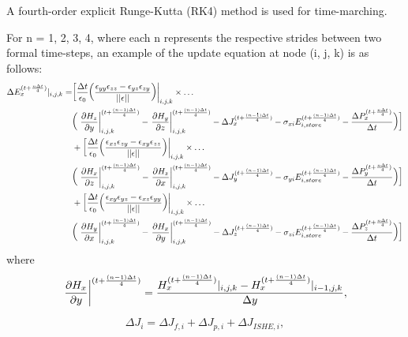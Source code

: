 \documentclass[]{article}
\begin{document}
		A fourth-order explicit Runge-Kutta (RK4) method is used for time-marching. 
		
		For n = 1, 2, 3, 4, where each n represents the respective strides between two formal time-steps, an example of the update equation at node (i, j, k) is as follows:
		\begin{align}
			\Delta E_{x}^{(t+\frac{n\Delta t}{4})}|_{i, j, k} = 
			& \bigg[\frac{\Delta t}{\epsilon_{0}}\bigg(\frac{\epsilon_{yy}\epsilon_{zz} - \epsilon_{yz}\epsilon_{zy}}{||\epsilon||}\bigg)\bigg|_{i, j, k} \times\dots\nonumber\\
			&\bigg(\left.\pdv{H_{z}}{y}\right\rvert^{(t + \frac{(n-1)\Delta t}{4})}_{i, j, k} - \left.\pdv{H_{y}}{z}\right\rvert^{(t + \frac{(n-1)\Delta t}{4})}_{i, j, k} - \Delta J_{x}^{(t + \frac{(n-1)\Delta t}{4})} - \sigma_{xi}E_{i, store}^{(t + \frac{(n-1)\Delta t}{4})} - \frac{\Delta P_{x}^{(t + \frac{n\Delta t}{4})}}{\Delta t}\bigg)\bigg]\nonumber \\
			& + \bigg[\frac{\Delta t}{\epsilon_{0}}\bigg(\frac{\epsilon_{xz}\epsilon_{zy} - \epsilon_{xy}\epsilon_{zz}}{||\epsilon||}\bigg)\bigg|_{i, j, k} \times\dots\nonumber\\
			&\bigg(\left.\pdv{H_{x}}{z}\right\rvert^{(t + \frac{(n-1)\Delta t}{4})}_{i, j, k} - \left.\pdv{H_{z}}{x}\right\rvert^{(t + \frac{(n-1)\Delta t}{4})}_{i, j, k} - \Delta J_{y}^{(t + \frac{(n-1)\Delta t}{4})} - \sigma_{yi}E_{i, store}^{(t + \frac{(n-1)\Delta t}{4})} - \frac{\Delta P_{y}^{(t + \frac{n\Delta t}{4})}}{\Delta t}\bigg)\bigg] \nonumber\\
			& + \bigg[\frac{\Delta t}{\epsilon_{0}}\bigg(\frac{\epsilon_{xy}\epsilon_{yz} - \epsilon_{xz}\epsilon_{yy}}{||\epsilon||}\bigg)\bigg|_{i, j, k} \times\dots\nonumber\\
			&\bigg(\left.\pdv{H_{y}}{x}\right\rvert^{(t + \frac{(n-1)\Delta t}{4})}_{i, j, k} - \left.\pdv{H_{x}}{y}\right\rvert^{(t + \frac{(n-1)\Delta t}{4})}_{i, j, k} - \Delta J_{z}^{(t + \frac{(n-1)\Delta t}{4})} - \sigma_{zi}E_{i, store}^{(t + \frac{(n-1)\Delta t}{4})} - \frac{\Delta P_{z}^{(t + \frac{n\Delta t}{4})}}{\Delta t}\bigg)\bigg]
		\end{align}
		where
		\begin{equation}
			\left.\pdv{H_{x}}{y}\right\rvert^{(t + \frac{(n-1)\Delta t}{4})} = \frac{H_{x}^{(t + \frac{(n-1)\Delta t}{4})}|_{i, j, k} - H_{x}^{(t + \frac{(n-1)\Delta t}{4})}|_{i-1, j, k}}{\Delta y},
		\end{equation}

		\begin{equation}
			\Delta J_{i} = \Delta J_{f, i} + \Delta J_{p, i} + \Delta J_{ISHE, i},
		\end{equation}
\end{document}
